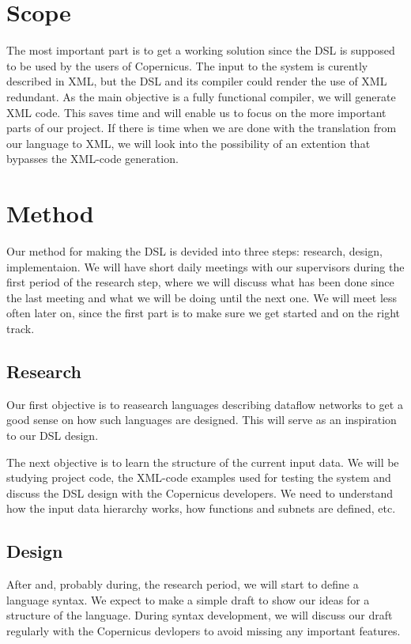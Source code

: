 \documentclass[a4paper]{article}
\begin{document}
\section{Scope}
The most important part is to get a working solution since the DSL is
supposed to be used by the users of Copernicus. The input to the
system is curently described in XML, but the DSL and its compiler
could render the use of XML redundant. As the main objective is a
fully functional compiler, we will generate XML code. This saves time
and will enable us to focus on the more important parts of our
project. If there is time when we are done with the translation from
our language to XML, we will look into the possibility of an extention
that bypasses the XML-code generation.

\section{Method}
Our method for making the DSL is devided into three steps: research,
design, implementaion. We will have short daily meetings with our
supervisors during the first period of the research step, where we
will discuss what has been done since the last meeting and what we
will be doing until the next one. We will meet less often later on,
since the first part is to make sure we get started and on the right
track.

\subsection{Research}
Our first objective is to reasearch languages describing dataflow
networks to get a good sense on how such languages are designed. This
will serve as an inspiration to our DSL design.

The next objective is to learn the structure of the current input
data. We will be studying project code, the XML-code examples used for
testing the system and discuss the DSL design with the Copernicus
developers. We need to understand how the input data hierarchy works,
how functions and subnets are defined, etc.

\subsection{Design}
After and, probably during, the research period, we will start to
define a language syntax. We expect to make a simple draft to show our
ideas for a structure of the language. During syntax development, we
will discuss our draft regularly with the Copernicus devlopers to
avoid missing any important features.
\end{document}
